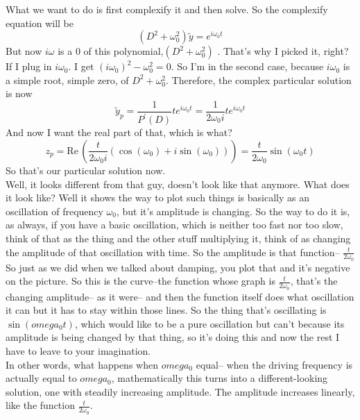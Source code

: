 What we want to do is first complexify it and then solve.
So the complexify equation will be
\begin{equation*}
  (D^2 + \omega_ 0 ^2) \tilde y = e^{i \omega _0 t}
\end{equation*}
But now $i \omega$ is a $0$ of this polynomial,$ (D^2 + \omega_ 0 ^2)$ .
That's why I picked it, right?
If I plug in $i \omega_ 0$.
I get $(i \omega_ 0)^2 -  \omega _ 0 ^2 = 0$. 
So I'm in the second case, because $i \omega _0$ is a simple root, simple zero, of
$D^2 + \omega _0 ^2$. 
Therefore, the complex particular solution is now
\begin{equation*}
  \tilde y _p = \frac{1}{P^{\prime}(D)}{te^{i \omega _0 t}}
  = \frac{1}{2\omega _0 i}{te^{i \omega _0 t}}  
\end{equation*}
And now I want the real part of that, which is what?
\begin{equation*}
  z_ p = \mathrm{Re\, }\left(\frac{t}{2\omega _0 i} \left( \cos (\omega _0) + i \sin (\omega _0) \right) \right)
  = \frac{t}{2\omega _0}  \sin (\omega _0 t)
\end{equation*}
So that's our particular solution now. \\


Well, it looks different from that guy,
doesn't look like that anymore.
What does it look like?
Well it shows the way to plot such things is basically as an oscillation of frequency $\omega _0$,
but it's amplitude is changing.
So the way to do it is, as always, if you have a basic oscillation, which is neither too fast nor too slow,
think of that as the thing and the other stuff multiplying it, think of as changing the amplitude
of that oscillation with time.
So the amplitude is that function-- $\frac{t}{2 \omega _0}$
So just as we did when we talked about damping, you plot that
and it's negative on the picture.
So this is the curve--the function whose graph is $\frac{t}{2 \omega _0}$,
that's the changing amplitude-- as it were--
and then the function itself does what oscillation it can
but it has to stay within those lines.
So the thing that's oscillating is $\sin (omega _0 t)$,
which would like to be a pure oscillation
but can't because its amplitude is being changed by that thing,
so it's doing this and now the rest I have
to leave to your imagination.\\


In other words, what happens when $omega _0$ equal--
when the driving frequency is actually equal to $omega _0$,
mathematically this turns into a different-looking solution, one
with steadily increasing amplitude.
The amplitude increases linearly, like the function $\frac{t}{2 \omega _0}$. \\

